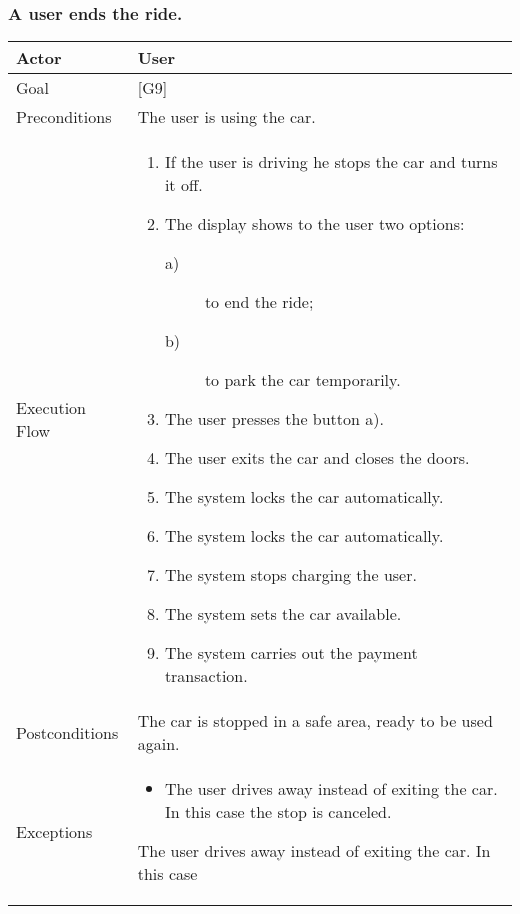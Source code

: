 \documentclass[english]{article}
\begin{document}
	\subsubsection{A user ends the ride.}
	\begin{tabularx}{\textwidth}{  l  X  }
		\hline
		Actor & User\\
		\hline
		Goal & [G9]\\
		\hline
		Preconditions & The user is using the car.\\
		\hline
		Execution Flow & \begin{enumerate}
			\item{If the user is driving he stops the car and turns it off.}
			\item{The display shows to the user two options:
				\begin{description}
					\item[a)]{ to end the ride;}
					\item[b)]{ to park the car temporarily.}
				\end{description}}
				\item{The user presses the button a).}
				\item{The user exits the car and closes the doors.}
				\item{The system locks the car automatically.}
				\item{The system locks the car automatically.}
				\item{The system stops charging the user.}
				\item{The system sets the car available.}
				\item{The system carries out the payment transaction.}
			\end{enumerate}\\
			\hline
			Postconditions & The car is stopped in a safe area, ready to be used again.\\
			\hline
			Exceptions & \begin{itemize}
				\item{The user drives away instead of exiting the car. In this case the stop is canceled.}
			\end{itemize}The user drives away instead of exiting the car. In this case\\
			\hline
		\end{tabularx}
		
\end{document}
